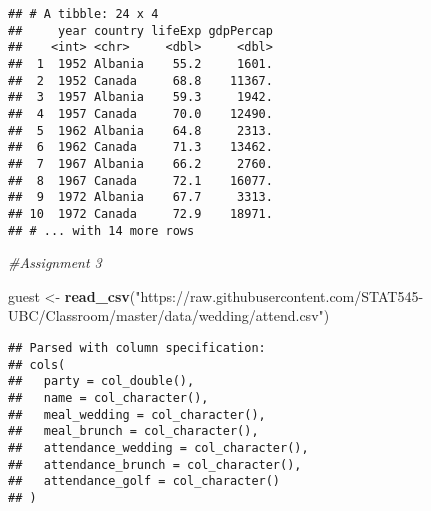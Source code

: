 \documentclass[]{article}
\newenvironment{Shaded}{\begin{snugshade}}{\end{snugshade}}
\newcommand{\KeywordTok}[1]{\textcolor[rgb]{0.13,0.29,0.53}{\textbf{#1}}}
\newcommand{\DataTypeTok}[1]{\textcolor[rgb]{0.13,0.29,0.53}{#1}}
\newcommand{\StringTok}[1]{\textcolor[rgb]{0.31,0.60,0.02}{#1}}
\newcommand{\CommentTok}[1]{\textcolor[rgb]{0.56,0.35,0.01}{\textit{#1}}}
\newcommand{\OperatorTok}[1]{\textcolor[rgb]{0.81,0.36,0.00}{\textbf{#1}}}
\newcommand{\NormalTok}[1]{#1}
\begin{document}
\begin{Shaded}
\end{Shaded}

\begin{verbatim}
## # A tibble: 24 x 4
##     year country lifeExp gdpPercap
##    <int> <chr>     <dbl>     <dbl>
##  1  1952 Albania    55.2     1601.
##  2  1952 Canada     68.8    11367.
##  3  1957 Albania    59.3     1942.
##  4  1957 Canada     70.0    12490.
##  5  1962 Albania    64.8     2313.
##  6  1962 Canada     71.3    13462.
##  7  1967 Albania    66.2     2760.
##  8  1967 Canada     72.1    16077.
##  9  1972 Albania    67.7     3313.
## 10  1972 Canada     72.9    18971.
## # ... with 14 more rows
\end{verbatim}

\begin{Shaded}
\begin{Highlighting}[]
\CommentTok{#Assignment 3}

\NormalTok{guest <-}\StringTok{ }\KeywordTok{read_csv}\NormalTok{(}\StringTok{"https://raw.githubusercontent.com/STAT545-UBC/Classroom/master/data/wedding/attend.csv"}\NormalTok{)}
\end{Highlighting}
\end{Shaded}

\begin{verbatim}
## Parsed with column specification:
## cols(
##   party = col_double(),
##   name = col_character(),
##   meal_wedding = col_character(),
##   meal_brunch = col_character(),
##   attendance_wedding = col_character(),
##   attendance_brunch = col_character(),
##   attendance_golf = col_character()
## )
\end{verbatim}
\end{document}

